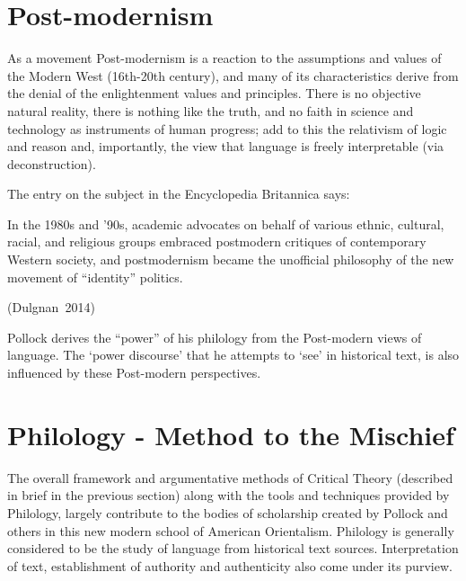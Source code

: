 \section*{Post-modernism}

As a movement Post-modernism is a reaction to the assumptions and values of the Modern West (16th-20th century), and many of its characteristics derive from the denial of the enlightenment values and principles. There is no objective natural reality, there is nothing like the truth, and no faith in science and technology as instruments of human progress; add to this the relativism of logic and reason and, importantly, the view that language is freely interpretable (via deconstruction). 

The entry on the subject in the Encyclopedia Britannica says:
\begin{myquote}
In the 1980s and '90s, academic advocates on behalf of various ethnic, cultural, racial, and religious groups embraced postmodern critiques of contemporary Western society, and postmodernism became the unofficial philosophy of the new movement of ``identity'' politics. 

\hfill \hbox{(Dulgnan 2014)}
\end{myquote}

\newpage

Pollock derives the ``power'' of his philology from the Post-modern views of language. The `power discourse' that he attempts to `see' in historical text, is also influenced by these Post-modern perspectives.\\[-20pt]

\section*{Philology - Method to the Mischief}

The overall framework and argumentative methods of Critical Theory (described in brief in the previous section) along with the tools and techniques provided by Philology, largely contribute to the bodies of scholarship created by Pollock and others in this new modern school of American Orientalism. Philology is generally considered to be the study of language from historical text sources. Interpretation of text, establishment of authority and authenticity also come under its purview.

